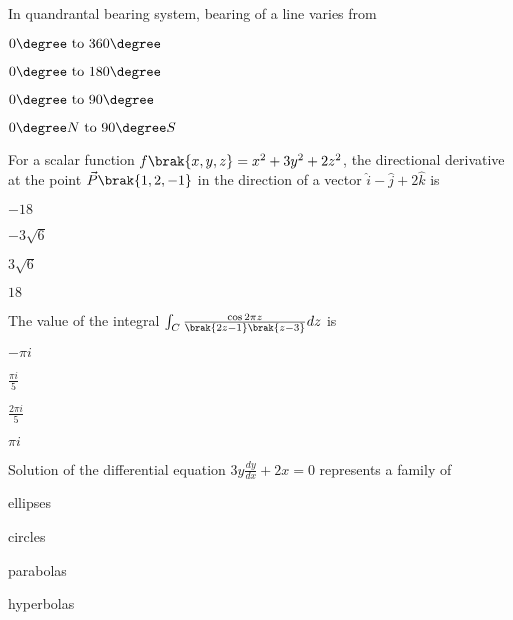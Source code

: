 \item In quandrantal bearing system, bearing of a line varies from 

\hfill{}
\begin{enumerate}
\begin{multicols}{4}
\item $0\degree \text{ to } 360\degree$
\item $0\degree \text{ to } 180\degree$
\item $0\degree \text{ to } 90\degree$
\item $0\degree N \text{ to } 90\degree S$
\end{multicols}
\end{enumerate}

\item For a scalar function $f\brak{x,y,z}=x^2+3y^2+2z^2$, the directional derivative at the point $\vec{P}\brak{1,2,-1}$ in the direction of a vector $\hat{i}-\hat{j}+2\hat{k}$ is

\hfill{}
\begin{enumerate}
\begin{multicols}{4}
\item $-18$
\item $-3\sqrt{6}$
\item $3\sqrt{6}$
\item $18$
\end{multicols}
\end{enumerate}

\item The value of the integral $\int_{C}\frac{\cos{2\pi z}}{\brak{2z-1}\brak{z-3}}dz$  is

\hfill{}
\begin{enumerate}
\begin{multicols}{4}
\item $-\pi i$
\item $\frac{\pi i}{5}$
\item $\frac{2\pi i}{5}$
\item $\pi i$
\end{multicols}
\end{enumerate}

\item Solution of the differential equation $3y\frac{dy}{dx}+2x=0$ represents a family of 

\hfill{}
\begin{enumerate}
\begin{multicols}{4}
\item ellipses
\item circles
\item parabolas
\item hyperbolas
\end{multicols}
\end{enumerate}


